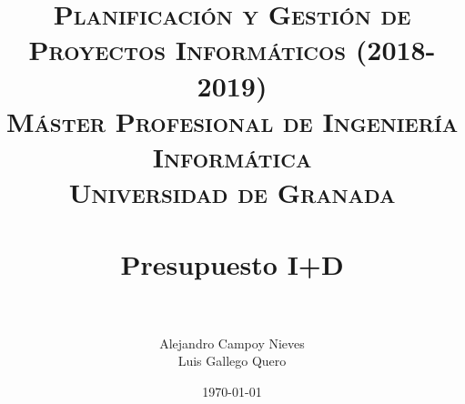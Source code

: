 


\title{	
	\normalfont \normalsize 
	\textsc{\textbf{Planificación y Gestión de Proyectos Informáticos (2018-2019)} \\ Máster Profesional de Ingeniería Informática \\ Universidad de Granada} \\ [25pt] %
	\horrule{0.5pt} \\[0.4cm] %
	\huge Presupuesto I+D \\ %
	\horrule{2pt} \\[0.5cm] %
}

\author{Alejandro Campoy Nieves \\ Luis Gallego Quero} %
\date{\normalsize\today} %

\usepackage[spanish, es-tabla]{babel}
\usepackage{hyperref} %
\hypersetup{
	colorlinks=true,
	linkcolor=blue,
	filecolor=magenta,      
	urlcolor=cyan,
}
\usepackage{graphicx}
\usepackage{amssymb, amsmath, amsbsy}
\usepackage{mathptmx}	
\usepackage{float}
\usepackage{booktabs}					%
\usepackage{eurosym}
\usepackage{xcolor}
\usepackage{colortbl}




	\maketitle %
	
	\newpage %
	
	\tableofcontents %
	
	
	\listoftables
	
	\newpage				



